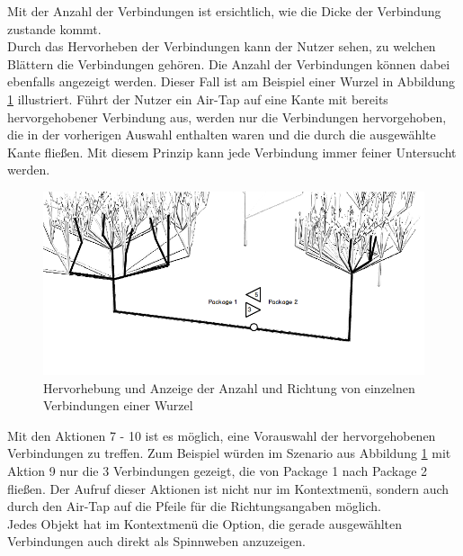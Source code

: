 \noindent Mit der Anzahl der Verbindungen ist ersichtlich, wie die Dicke der Verbindung zustande kommt.\\

\noindent Durch das Hervorheben der Verbindungen kann der Nutzer sehen, zu welchen Blättern die Verbindungen gehören. Die Anzahl der Verbindungen können dabei ebenfalls angezeigt werden. Dieser Fall ist am Beispiel einer Wurzel in Abbildung \ref{fig:root-interaction} illustriert. Führt der Nutzer ein Air-Tap auf eine Kante mit bereits hervorgehobener Verbindung aus, werden nur die Verbindungen hervorgehoben, die in der vorherigen Auswahl enthalten waren und die durch die ausgewählte Kante fließen. Mit diesem Prinzip kann jede Verbindung immer feiner Untersucht werden.\\

\begin{figure}[htb]
  \includegraphics[width=\textwidth]{figures/root-interaction}
  \caption{Hervorhebung und Anzeige der Anzahl und Richtung von einzelnen Verbindungen einer Wurzel}
  \label{fig:root-interaction}
\end{figure}

\noindent Mit den Aktionen 7 - 10 ist es möglich, eine Vorauswahl der hervorgehobenen Verbindungen zu treffen. Zum Beispiel würden im Szenario aus Abbildung \ref{fig:root-interaction} mit Aktion 9 nur die 3 Verbindungen gezeigt, die von Package 1 nach Package 2 fließen. Der Aufruf dieser Aktionen ist nicht nur im Kontextmenü, sondern auch durch den Air-Tap auf die Pfeile für die Richtungsangaben möglich. \\

\noindent Jedes Objekt hat im Kontextmenü die Option, die gerade ausgewählten Verbindungen auch direkt als Spinnweben anzuzeigen.\\

